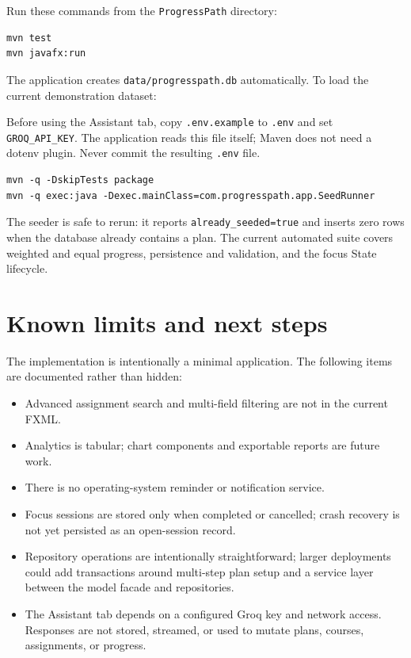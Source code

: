 \documentclass[11pt,a4paper]{article}
\newcommand{\code}[1]{\texttt{#1}}
\begin{document}
Run these commands from the \code{ProgressPath} directory:

\begin{verbatim}
mvn test
mvn javafx:run
\end{verbatim}

The application creates \code{data/progresspath.db} automatically. To load the current demonstration dataset:

Before using the Assistant tab, copy \code{.env.example} to \code{.env} and set \code{GROQ\_API\_KEY}. The application reads this file itself; Maven does not need a dotenv plugin. Never commit the resulting \code{.env} file.

\begin{verbatim}
mvn -q -DskipTests package
mvn -q exec:java -Dexec.mainClass=com.progresspath.app.SeedRunner
\end{verbatim}

The seeder is safe to rerun: it reports \code{already\_seeded=true} and inserts zero rows when the database already contains a plan. The current automated suite covers weighted and equal progress, persistence and validation, and the focus State lifecycle.

\section{Known limits and next steps}

The implementation is intentionally a minimal application. The following items are documented rather than hidden:

\begin{itemize}
  \item Advanced assignment search and multi-field filtering are not in the current FXML.
  \item Analytics is tabular; chart components and exportable reports are future work.
  \item There is no operating-system reminder or notification service.
  \item Focus sessions are stored only when completed or cancelled; crash recovery is not yet persisted as an open-session record.
  \item Repository operations are intentionally straightforward; larger deployments could add transactions around multi-step plan setup and a service layer between the model facade and repositories.
  \item The Assistant tab depends on a configured Groq key and network access. Responses are not stored, streamed, or used to mutate plans, courses, assignments, or progress.
\end{itemize}
\end{document}
